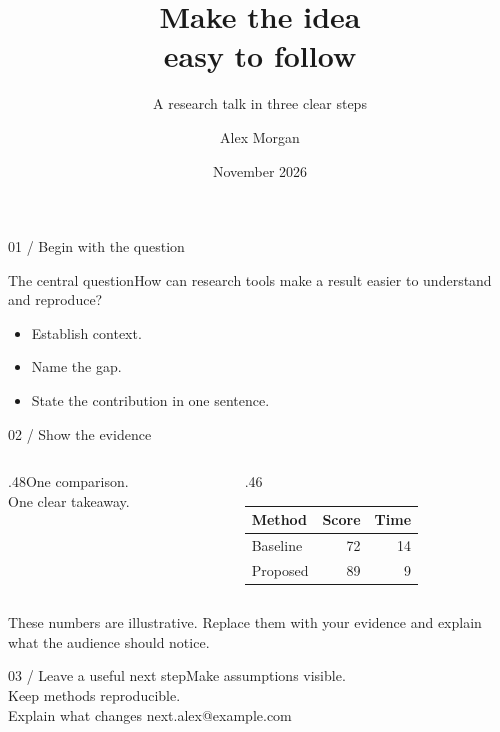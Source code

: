 \documentclass[aspectratio=169]{beamer}
\title{Make the idea\\easy to follow}\subtitle{A research talk in three clear steps}
\author{Alex Morgan}\institute{Example University}\date{November 2026}
\begin{document}
\begin{frame}\vspace{5mm}{\color{accent}\rule{18mm}{2pt}}\vspace{4mm}\titlepage\end{frame}
\begin{frame}{01 / Begin with the question}
\begin{block}{The central question}How can research tools make a result easier to understand and reproduce?\end{block}
\begin{itemize}\item Establish context.\item Name the gap.\item State the contribution in one sentence.\end{itemize}\end{frame}
\begin{frame}{02 / Show the evidence}
\begin{columns}\begin{column}{.48\textwidth}\Large One comparison.\\One clear takeaway.\end{column}
\begin{column}{.46\textwidth}\begin{tabular}{lrr}\toprule Method & Score & Time\\\midrule Baseline & 72 & 14\\Proposed & 89 & 9\\\bottomrule\end{tabular}\end{column}\end{columns}
\vspace{7mm}These numbers are illustrative. Replace them with your evidence and explain what the audience should notice.\end{frame}
\begin{frame}{03 / Leave a useful next step}\Large Make assumptions visible.\\[4mm]Keep methods reproducible.\\[4mm]Explain what changes next.\vfill\normalsize alex@example.com\end{frame}
\end{document}

